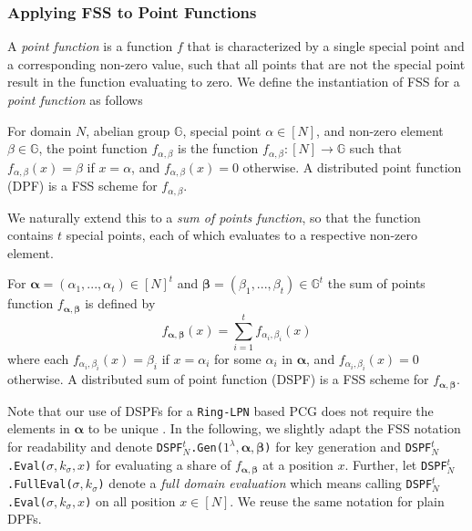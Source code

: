 \subsubsection{Applying FSS to Point Functions}
A \textit{point function} is a function \(f\) that is characterized by a single special point and a corresponding non-zero value, such that all points that are not the special point result in the function evaluating to zero. We define the instantiation of FSS for a \textit{point function} as follows

\begin{definition}
For domain $N$, abelian group $\mathbb{G}$, special point $\alpha \in [N]$, and non-zero element $\beta \in \mathbb{G}$, the point function $f_{\alpha, \beta}$ is the function $f_{\alpha, \beta}: [N] \rightarrow \mathbb{G}$ such that $f_{\alpha, \beta}(x) = \beta$ if $x = \alpha$, and $f_{\alpha, \beta}(x) = 0$ otherwise. A distributed point function (DPF) is a FSS scheme for $f_{\alpha, \beta}$.
\end{definition}

We naturally extend this to a \textit{sum of points function}, so that the function contains $t$ special points, each of which evaluates to a respective non-zero element.

\begin{definition}
\label{def:dspf}
For $\bm{\alpha} = (\alpha_1,...,\alpha_t) \in [N]^t$ and $\bm{\beta} = (\beta_1,...,\beta_t) \in \mathbb{G}^t$ the sum of points function $f_{\bm{\alpha}, \bm{\beta}}$ is defined by
$$
f_{\bm{\alpha}, \bm{\beta}}(x) = \sum_{i=1}^{t} f_{\alpha_i,\beta_i}(x)
$$
where each \( f_{\alpha_i,\beta_i}(x) = \beta_i \) if \( x = \alpha_i \) for some \( \alpha_i \) in \( \bm{\alpha} \), and \( f_{\alpha_i,\beta_i}(x) = 0 \) otherwise. A distributed sum of point function (DSPF) is a FSS scheme for $f_{\bm{\alpha}, \bm{\beta}}$.
\end{definition}

Note that our use of DSPFs for a \texttt{Ring-LPN} based PCG does not require the elements in $\bm{\alpha}$ to be unique \cite{boyle2020efficient}. In the following, we slightly adapt the FSS notation for readability and denote \texttt{DSPF$^t_N$.Gen($1^\lambda, \bm{\alpha}, \bm{\beta}$)} for key generation and \texttt{DSPF$^t_N$.Eval($\sigma, k_\sigma, x$)} for evaluating a share of $f_{\bm{\alpha}, \bm{\beta}}$ at a position $x$. Further, let \texttt{DSPF$^t_N$.FullEval($\sigma, k_\sigma$)} denote a \textit{full domain evaluation} which means calling \texttt{DSPF$^t_N$.Eval($\sigma, k_\sigma, x$)} on all position $x \in [N]$. We reuse the same notation for plain DPFs.

